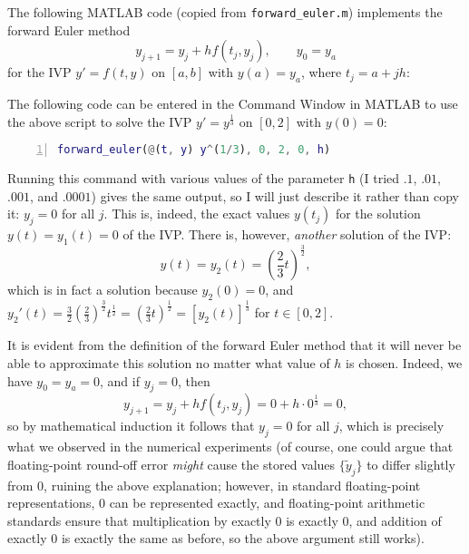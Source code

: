 \documentclass{homework}
\begin{document}
	\question 
	\begin{alphaparts}
		\questionpart The following MATLAB code (copied from \verb*|forward_euler.m|) implements the forward Euler method
		\begin{equation}
			y_{j+1} = y_j + hf(t_j, y_j),\qquad y_0 = y_a
		\end{equation}
		for the IVP $y' = f(t,y)$ on $[a,b]$ with $y(a) = y_a$, where $t_j = a+ jh$:
		
		
		\questionpart The following code can be entered in the Command Window in MATLAB to use the above script to solve the IVP $y' = y^\frac{1}{3}$ on $[0,2]$ with $y(0) = 0$:
		\begin{lstlisting}[language=MATLAB, numbers=left, frame=single, basicstyle=\small\ttfamily, showstringspaces=false]
forward_euler(@(t, y) y^(1/3), 0, 2, 0, h)
		\end{lstlisting}
		Running this command with various values of the parameter \verb*|h| (I tried $.1$, $.01$, $.001$, and $.0001$) gives the same output, so I will just describe it rather than copy it: $y_j = 0$ for all $j$. This is, indeed, the exact values $y(t_j)$ for the solution $y(t) = y_1(t) = 0$ of the IVP. There is, however, \textit{another} solution of the IVP:
		\begin{equation}
			y(t) = y_2(t) = \left(\frac{2}{3}t\right)^\frac{3}{2},
		\end{equation}
		which is in fact a solution because $y_2(0) = 0$, and $y_2'(t) = \frac{3}{2}\left(\frac{2}{3}\right)^\frac{3}{2}t^\frac{1}{2} = \left(\frac{2}{3}t\right)^\frac{1}{2} = [y_2(t)]^\frac{1}{3}$ for $t \in [0,2]$.
		
		It is evident from the definition of the forward Euler method that it will never be able to approximate this solution no matter what value of $h$ is chosen. Indeed, we have $y_0 = y_a = 0$, and if $y_j = 0$, then
		\begin{equation}
			y_{j+1} = y_j + hf(t_j, y_j) = 0 + h\cdot 0^\frac{1}{3} = 0,
		\end{equation}
		so by mathematical induction it follows that $y_j = 0$ for all $j$, which is precisely what we observed in the numerical experiments (of course, one could argue that floating-point round-off error \textit{might} cause the stored values $\{\tilde{y}_j\}$ to differ slightly from $0$, ruining the above explanation; however, in standard floating-point representations, $0$ can be represented exactly, and floating-point arithmetic standards ensure that multiplication by exactly $0$ is exactly $0$, and addition of exactly $0$ is exactly the same as before, so the above argument still works).
	\end{alphaparts}
	
\end{document}
